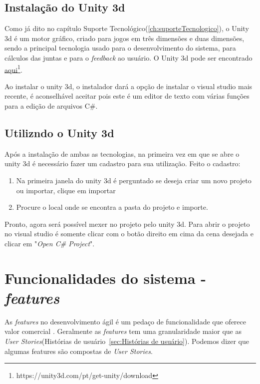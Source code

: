 \subsection{Instalação do Unity 3d}\label{sub:instalacaoUnity}
  Como já dito no capítulo Suporte Tecnológico(\ref{ch:suporteTecnologico}), o Unity 3d é um motor gráfico, criado para jogos em três dimensões e duas dimensões,
sendo a principal tecnologia usado para o desenvolvimento do sistema, para cálculos das juntas e para o \textit{feedback} ao usuário.
O Unity 3d pode ser encontrado \href{https://unity3d.com/pt/get-unity/download}{aqui}\footnote{https://unity3d.com/pt/get-unity/download}.

  Ao instalar o unity 3d, o instalador dará
a opção de instalar o visual studio mais recente, é aconselhável aceitar pois este é um editor de texto com várias funções para a edição
de arquivos C\#.

\subsection{Utilizndo o Unity 3d}
  Após a instalação de ambas as tecnologias, na primeira vez em que se abre o unity 3d é necessário fazer um cadastro para sua utilização. Feito
o cadastro:
\begin{enumerate}
  \item Na primeira janela do unity 3d é perguntado se deseja criar um novo projeto ou importar, clique em importar
  \item Procure o local onde se encontra a pasta do projeto e importe.
\end{enumerate}

  Pronto, agora será possível mexer no projeto pelo unity 3d. Para abrir o projeto no visual studio é somente clicar com o botão direito em cima
da cena desejada e clicar em "\textit{Open C\# Project}".

 \section{Funcionalidades do sistema - \textit{features}}\label{sub:features}
     As \textit{features} no desenvolvimento ágil é um pedaço de funcionalidade que oferece valor comercial \cite{versionOne}.
   Geralmente as \textit{features} tem uma granularidade maior que as \textit{User Stories}(Histórias de usuário~\ref{sec:Histórias de usuário}).
   Podemos dizer que algumas features são compostas de \textit{User Stories}.

